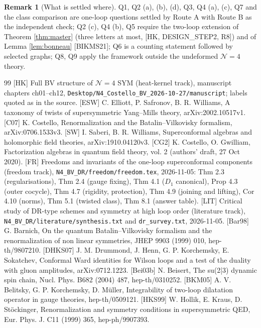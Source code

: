 \documentclass[11pt]{article}
\theoremstyle{definition}
\newtheorem{remark}[definition]{Remark}
\numberwithin{equation}{section}
\begin{document}
\begin{remark}[What is settled where]
Q1, Q2 (a), (b), (d), Q3, Q4 (a), (c), Q7 and the class comparison are one-loop questions settled by Route A with Route B as the independent check; Q2 (c), Q4 (b), Q5 require the two-loop extension of Theorem \ref{thm:master} (three letters at most, [HK, DESIGN\_STEP2, R8]) and of Lemma \ref{lem:bonneau} [BIKMS21]; Q6 is a counting statement followed by selected graphs; Q8, Q9 apply the framework outside the undeformed $\mathcal N=4$ theory.
\end{remark}

\begin{thebibliography}{99}
 [HK] Full BV structure of $\mathcal N=4$ SYM (heat-kernel track), manuscript chapters ch01--ch12, \texttt{Desktop/N4\_Costello\_BV\_2026-10-27/manuscript}; labels quoted as in the source.
 [ESW] C. Elliott, P. Safronov, B. R. Williams, A taxonomy of twists of supersymmetric Yang--Mills theory, arXiv:2002.10517v1.
 [C07] K. Costello, Renormalization and the Batalin--Vilkovisky formalism, arXiv:0706.1533v3.
 [SW] I. Saberi, B. R. Williams, Superconformal algebras and holomorphic field theories, arXiv:1910.04120v3.
 [CG2] K. Costello, O. Gwilliam, Factorization algebras in quantum field theory, vol. 2 (authors' draft, 27 Oct 2020).
 [FR] Freedoms and invariants of the one-loop superconformal components (freedom track), \texttt{N4\_BV\_DR/freedom/freedom.tex}, 2026-11-05: Thm 2.3 (regularisations), Thm 2.4 (gauge fixing), Thm 4.1 ($D_1$ canonical), Prop 4.3 (outer cocycle), Thm 4.7 (rigidity, protection), Thm 4.9 (joining and lifting), Cor 4.10 (norms), Thm 5.1 (twisted class), Thm 8.1 (answer table).
 [LIT] Critical study of DR-type schemes and symmetry at high loop order (literature track), \texttt{N4\_BV\_DR/literature/synthesis.txt} and \texttt{dr\_survey.txt}, 2026-11-05.
 [Bar98] G. Barnich, On the quantum Batalin--Vilkovisky formalism and the renormalization of non linear symmetries, JHEP 9903 (1999) 010, hep-th/9807210.
 [DHKS07] J. M. Drummond, J. Henn, G. P. Korchemsky, E. Sokatchev, Conformal Ward identities for Wilson loops and a test of the duality with gluon amplitudes, arXiv:0712.1223.
 [Bei03b] N. Beisert, The su(2|3) dynamic spin chain, Nucl. Phys. B682 (2004) 487, hep-th/0310252.
 [BKM05] A. V. Belitsky, G. P. Korchemsky, D. M\"uller, Integrability of two-loop dilatation operator in gauge theories, hep-th/0509121.
 [HKS99] W. Hollik, E. Kraus, D. St\"ockinger, Renormalization and symmetry conditions in supersymmetric QED, Eur. Phys. J. C11 (1999) 365, hep-ph/9907393.

\end{thebibliography}
\end{document}
